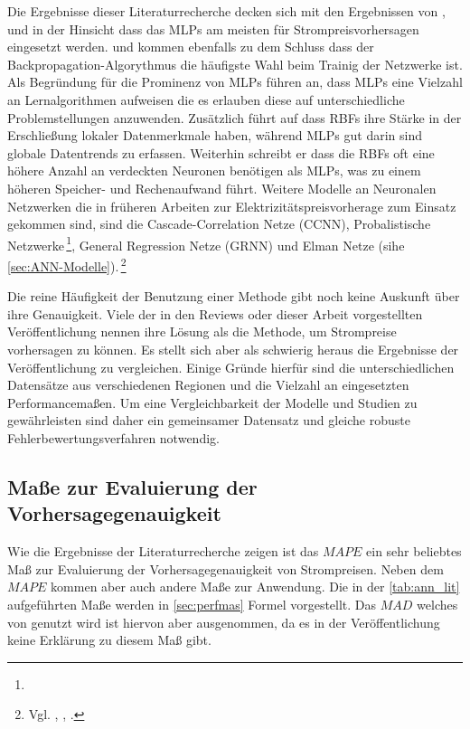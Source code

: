 Die Ergebnisse dieser Literaturrecherche decken sich mit den Ergebnissen von \citet{Aggarwal2009}, \citet{Weron2014} und \citet{Panapakidis2016} in der Hinsicht dass das MLPs am meisten für Strompreisvorhersagen eingesetzt werden. \citet{Aggarwal2009} und \citet{Weron2014} kommen ebenfalls zu dem Schluss dass der Backpropagation-Algorythmus die häufigste Wahl beim Trainig der Netzwerke ist. Als Begründung für die Prominenz von MLPs führen \citet{Panapakidis2016} an, dass MLPs eine Vielzahl an Lernalgorithmen aufweisen die es erlauben diese auf unterschiedliche Problemstellungen anzuwenden. Zusätzlich führt \citet{Weron2014} auf dass RBFs ihre Stärke in der Erschließung lokaler Datenmerkmale haben, während MLPs gut darin sind globale Datentrends zu erfassen. Weiterhin schreibt er dass die RBFs oft eine höhere Anzahl an verdeckten Neuronen benötigen als MLPs, was zu einem höheren Speicher- und Rechenaufwand führt. 
Weitere Modelle an Neuronalen Netzwerken die in früheren Arbeiten zur Elektrizitätspreisvorherage zum Einsatz gekommen sind, sind die Cascade-Correlation Netze (CCNN), Probalistische Netzwerke\,\footnote{}, General Regression Netze (GRNN) und Elman Netze (sihe \autoref{sec:ANN-Modelle}).\,\footnote{Vgl. \citet[757]{Cerjan2013}, \citet[28 ff]{Weron2014}, \citet[134]{Panapakidis2016}.}

Die reine Häufigkeit der Benutzung einer Methode gibt noch keine Auskunft über ihre Genauigkeit. Viele der in den Reviews oder dieser Arbeit vorgestellten Veröffentlichung nennen ihre Lösung als die Methode, um Strompreise vorhersagen zu können. Es stellt sich aber als schwierig heraus die Ergebnisse der Veröffentlichung zu vergleichen. Einige Gründe hierfür sind die unterschiedlichen Datensätze aus verschiedenen Regionen und die Vielzahl an eingesetzten Performancemaßen. Um eine Vergleichbarkeit der Modelle und Studien zu gewährleisten sind daher ein gemeinsamer Datensatz und gleiche robuste Fehlerbewertungsverfahren  notwendig.\, 

\subsection{Maße zur Evaluierung der Vorhersagegenauigkeit}

Wie die Ergebnisse der Literaturrecherche zeigen ist das $MAPE$ ein sehr beliebtes Maß zur Evaluierung der Vorhersagegenauigkeit von Strompreisen. Neben dem $MAPE$ kommen aber auch andere Maße zur Anwendung. Die in der \autoref{tab:ann_lit} aufgeführten Maße werden in \autoref{sec:perfmas} Formel vorgestellt. Das $MAD$ welches von \citet{Keles2016} genutzt wird ist hiervon aber ausgenommen, da es in der Veröffentlichung keine Erklärung zu diesem Maß gibt.


